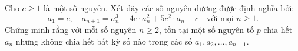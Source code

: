 \ifshowproblem
\begin{problem}\label{example:TWN-2015-TST3-M1-P3}
    Cho \( c \ge 1 \) là một số nguyên. Xét dãy các số nguyên dương được định nghĩa bởi:
    \[
        a_1 = c,\quad a_{n+1} = a_n^3 - 4c\cdot a_n^2 + 5c^2\cdot a_n + c \quad \text{với mọi } n \ge 1.
    \]
    Chứng minh rằng với mỗi số nguyên \( n \ge 2 \), tồn tại một số nguyên tố \( p \) chia hết \( a_n \)
    nhưng không chia hết bất kỳ số nào trong các số \( a_1, a_2, \ldots, a_{n-1} \).
\end{problem}
\fi

\footnotemark
{}
\fi
